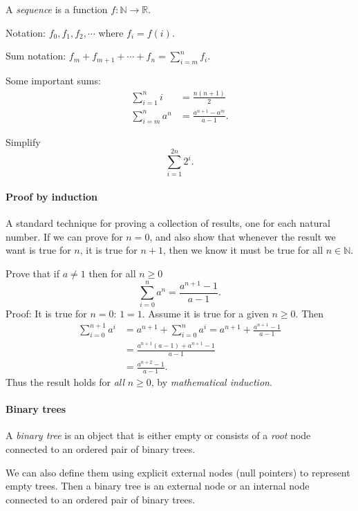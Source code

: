 A \emph{sequence} is a function $f:\mathbb{N} \to \mathbb{R}$. 

Notation: $f_0, f_1, f_2, \cdots$ where $f_i = f(i)$.

Sum notation: $f_m+f_{m+1}+\cdots +f_n = \sum_{i=m}^n f_i$.

Some important sums: 
\begin{align*}
\sum_{i=1}^n i & = \frac{n(n+1)}{2} \\
\sum_{i=m}^n a^n&  = \frac{a^{n+1}-a^m}{a-1}.
\end{align*}

\begin{Boxample}[4]
Simplify 
$$
\sum_{i=1}^{2n} 2^i.
$$
\end{Boxample}

\paragraph{Proof by induction}
A standard technique for proving a collection of results, one for each natural number. If we can prove for $n=0$, and also show that whenever the result we want is true for $n$, it is true for $n+1$, then we know it must be true for all $n\in \mathbb{N}$.

\begin{Example}
Prove that if $a\neq 1$ then for all  $n\geq 0$
$$
\sum_{i=0}^n a^n = \frac{a^{n+1} - 1}{a - 1}.
$$
Proof: It is true for $n=0$: $1 = 1$. Assume it is true for a given  $n\geq 0$. Then
\begin{align*}
\sum_{i=0}^{n+1} a^i & = a^{n+1} + \sum_{i=0}^n a^i 
= a^{n+1} + \frac{a^{n+1} - 1}{a-1} \\
& = \frac{a^{n+1} (a - 1) + a^{n+1} - 1}{a-1}\\
& = \frac{a^{n+2} - 1}{a-1}.
\end{align*}
Thus the result holds for \emph{all} $n\geq 0$, by \emph{mathematical induction}.
\end{Example}



\paragraph{Binary trees}

A \emph{binary tree} is an object that is either empty or consists of a \emph{root} node connected to an ordered pair of binary trees. 
 
We can also define them using explicit external nodes (null pointers) to represent empty trees. Then a binary tree is an external node or an internal node connected to an ordered pair of binary trees.
 
